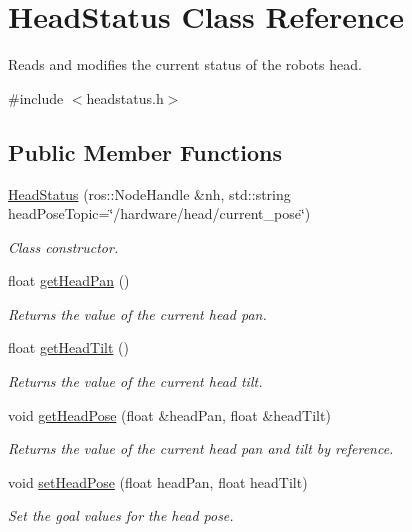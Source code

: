 \hypertarget{class_head_status}{}\section{Head\+Status Class Reference}
\label{class_head_status}


Reads and modifies the current status of the robot\textquotesingle{}s head.  




{\ttfamily \#include $<$headstatus.\+h$>$}

\subsection*{Public Member Functions}
\begin{DoxyCompactItemize}
\item 
\hyperlink{class_head_status_ab56de73db288048c573a6766459c79a6}{Head\+Status} (ros\+::\+Node\+Handle \&nh, std\+::string head\+Pose\+Topic=\char`\"{}/hardware/head/current\+\_\+pose\char`\"{})
\begin{DoxyCompactList}\small\item\em Class constructor. \end{DoxyCompactList}\item 
float \hyperlink{class_head_status_a06c359a7b1ed7a594a0b34912af1a030}{get\+Head\+Pan} ()
\begin{DoxyCompactList}\small\item\em Returns the value of the current head pan. \end{DoxyCompactList}\item 
float \hyperlink{class_head_status_a514dc6720510539a3dd7d686a1b200bf}{get\+Head\+Tilt} ()
\begin{DoxyCompactList}\small\item\em Returns the value of the current head tilt. \end{DoxyCompactList}\item 
void \hyperlink{class_head_status_a45af631cd9ae427d7ba3f99e83069e14}{get\+Head\+Pose} (float \&head\+Pan, float \&head\+Tilt)
\begin{DoxyCompactList}\small\item\em Returns the value of the current head pan and tilt by reference. \end{DoxyCompactList}\item 
void \hyperlink{class_head_status_a1b78aae85199df608c09f748f25dae75}{set\+Head\+Pose} (float head\+Pan, float head\+Tilt)
\begin{DoxyCompactList}\small\item\em Set the goal values for the head pose. \end{DoxyCompactList}\end{DoxyCompactItemize}


